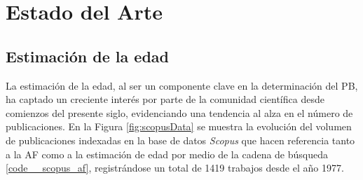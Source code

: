 \chapter{Estado del Arte}

\section{Estimación de la edad}


La estimación de la edad, al ser un componente clave en la determinación del PB, ha captado un creciente interés por parte de la comunidad científica desde comienzos del presente siglo, evidenciando una tendencia al alza en el número de publicaciones. En la Figura \ref{fig:scopusData} se muestra la evolución del volumen de publicaciones indexadas en la base de datos \textit{Scopus} que hacen referencia tanto a la AF como a la estimación de edad por medio de la cadena de búsqueda \ref{code__scopus_af}, registrándose un total de 1419 trabajos desde el año 1977.

